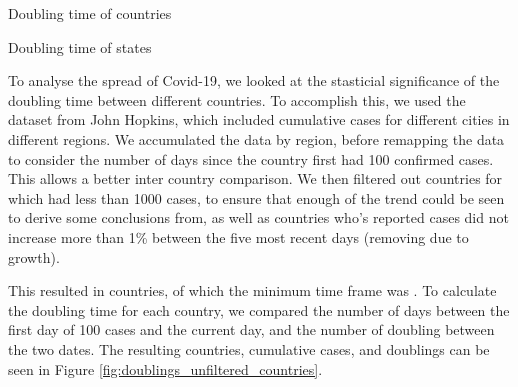 \begin{table}[htb!]
  \caption{Doubling time of countries}
  \label{table:doubling_countries}
  \begin{adjustbox}{width=\linewidth}
  \end{adjustbox}
\end{table}

\if{}
\begin{table}[htb!]
  \caption{Doubling time of states}
  \label{table:doubling_states}
  \begin{adjustbox}{width=\linewidth}
  \end{adjustbox}
\end{table}
\fi

To analyse the spread of Covid-19, we looked at the stasticial significance of the doubling time between different countries.
To accomplish this, we used the dataset from John Hopkins, which included cumulative cases for different cities in different regions.
We accumulated the data by region, before remapping the data to consider the number of days since the country first had 100 confirmed cases.
This allows a better inter country comparison.
We then filtered out countries for which had less than 1000 cases, to ensure that enough of the trend could be seen to derive some conclusions from, as well as countries who's reported cases did not increase more than 1\% between the five most recent days (removing  due to growth).

This resulted in  countries, of which the minimum time frame was .
To calculate the doubling time for each country, we compared the number of days between the first day of 100 cases and the current day, and the number of doubling between the two dates.
The resulting countries, cumulative cases, and doublings can be seen in Figure \ref{fig:doublings_unfiltered_countries}.

